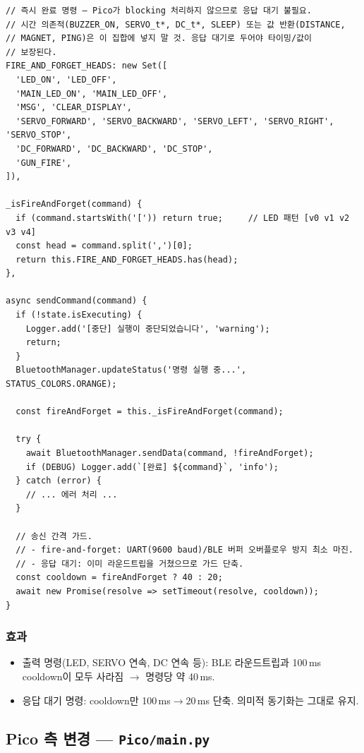 \documentclass[11pt, oneside]{article}
\begin{document}
\begin{verbatim}
// 즉시 완료 명령 — Pico가 blocking 처리하지 않으므로 응답 대기 불필요.
// 시간 의존적(BUZZER_ON, SERVO_t*, DC_t*, SLEEP) 또는 값 반환(DISTANCE,
// MAGNET, PING)은 이 집합에 넣지 말 것. 응답 대기로 두어야 타이밍/값이
// 보장된다.
FIRE_AND_FORGET_HEADS: new Set([
  'LED_ON', 'LED_OFF',
  'MAIN_LED_ON', 'MAIN_LED_OFF',
  'MSG', 'CLEAR_DISPLAY',
  'SERVO_FORWARD', 'SERVO_BACKWARD', 'SERVO_LEFT', 'SERVO_RIGHT', 'SERVO_STOP',
  'DC_FORWARD', 'DC_BACKWARD', 'DC_STOP',
  'GUN_FIRE',
]),

_isFireAndForget(command) {
  if (command.startsWith('[')) return true;     // LED 패턴 [v0 v1 v2 v3 v4]
  const head = command.split(',')[0];
  return this.FIRE_AND_FORGET_HEADS.has(head);
},

async sendCommand(command) {
  if (!state.isExecuting) {
    Logger.add('[중단] 실행이 중단되었습니다', 'warning');
    return;
  }
  BluetoothManager.updateStatus('명령 실행 중...', STATUS_COLORS.ORANGE);

  const fireAndForget = this._isFireAndForget(command);

  try {
    await BluetoothManager.sendData(command, !fireAndForget);
    if (DEBUG) Logger.add(`[완료] ${command}`, 'info');
  } catch (error) {
    // ... 에러 처리 ...
  }

  // 송신 간격 가드.
  // - fire-and-forget: UART(9600 baud)/BLE 버퍼 오버플로우 방지 최소 마진.
  // - 응답 대기: 이미 라운드트립을 거쳤으므로 가드 단축.
  const cooldown = fireAndForget ? 40 : 20;
  await new Promise(resolve => setTimeout(resolve, cooldown));
}
\end{verbatim}

\subsubsection*{효과}

\begin{itemize}
  \item 출력 명령(LED, SERVO 연속, DC 연속 등): BLE 라운드트립과 100\,ms
        cooldown이 모두 사라짐 $\rightarrow$ 명령당 약 40\,ms.
  \item 응답 대기 명령: cooldown만 100\,ms$\rightarrow$20\,ms 단축. 의미적
        동기화는 그대로 유지.
\end{itemize}

\subsection{Pico 측 변경 --- \texttt{Pico/main.py}}
\end{document}

